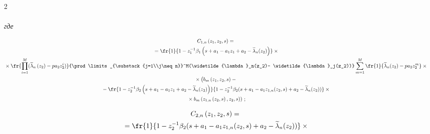\begin{multicols}{2}
\begin{multline*}
\end{multline*}


\textit{где}


\begin{multline*}


C_{1,n}\left(z_1,z_2,s\right)={}\\


{}=\fr{1}{1-z_1^{-1}\beta_1


\left(s+a_1-a_1 z_1+a_2-\widetilde{\lambda}_n(z_2)\right)}\times{}\\


{}\times\fr{\prod\limits_{i=1}^M(\widetilde{\lambda}_n\left(z_2\right)-pa_2 z_2^i)}


{\prod\limits_{\substack{j=1\\j\neq n}}^M(\widetilde{\lambda}_n(z_2)-


\widetilde{\lambda}_j(z_2))}


\sum\limits_{m=1}^M\fr{1}{\widetilde{\lambda}_n(z_2)-pa_2 z_2^m}\times{}\\


{}\times\left(


\vphantom{\fr{1-\tilde{\Lambda}_2^{-1}}{1-z_2^{-1}}}


b_m\left(z_1,z_2,s\right)-{}\right.\\


{}-\fr{1-z_2^{-1}\beta_2\left(s+a_1-a_1 z_1+a_2-


\widetilde{\lambda}_n(z_2)\right)}


{1-z_2^{-1}\beta_2(s+a_1-a_1 z_{1,n}(z_2,s)+a_2-\widetilde{\lambda}_n(z_2))}\times{}\\


\left.{}\times b_m\left(z_{1,n}\left(z_2,s\right),z_2,s\right)\right)\,;


\end{multline*}





\vspace*{-12pt}





\noindent


\begin{multline*}


C_{2,n}\left(z_1,z_2,s\right)={}\\


{}=\fr{1}{1-z_2^{-1}\beta_2(s+a_1-a_1 z_{1,n}


(z_2,s)+a_2-\widetilde{\lambda}_n(z_2))}\times{}\\



\end{multline*}
\end{multicols}
